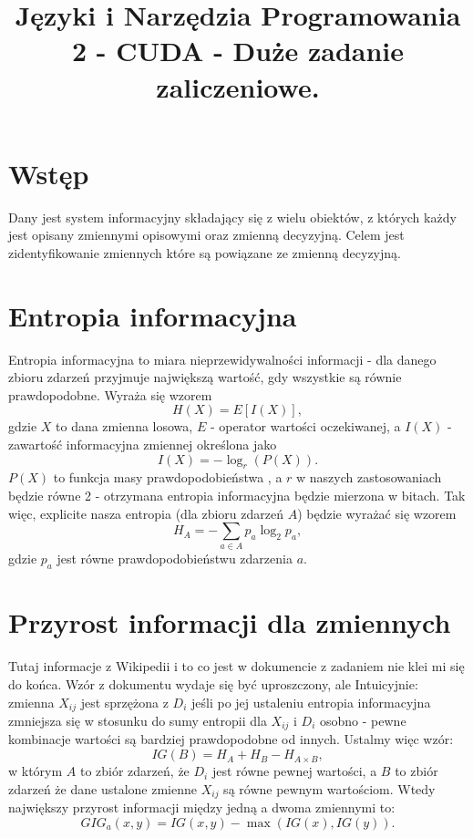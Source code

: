 \documentclass[a4paper]{article}
\title{Języki i Narzędzia Programowania 2 - CUDA - Duże zadanie zaliczeniowe.}
\begin{document}
    \maketitle
    \section{Wstęp}
    Dany jest system informacyjny składający się z wielu obiektów, z których każdy jest opisany zmiennymi opisowymi oraz zmienną decyzyjną. Celem jest zidentyfikowanie zmiennych które są powiązane ze zmienną decyzyjną.
    \section{Entropia informacyjna}
    Entropia informacyjna to miara nieprzewidywalności informacji - dla danego zbioru zdarzeń przyjmuje największą wartość, gdy wszystkie są równie prawdopodobne. Wyraża się wzorem
    \begin{equation} H(X) = E[I(X)], \end{equation}
gdzie $X$ to dana zmienna losowa, $E$ - operator wartości oczekiwanej, a $I(X)$ - zawartość informacyjna zmiennej określona jako
    \begin{equation} I(X) = -\log_r(P(X)). \end{equation}
$P(X)$ to funkcja masy prawdopodobieństwa , a $r$ w naszych zastosowaniach będzie równe 2 - otrzymana entropia informacyjna będzie mierzona w bitach. Tak więc, explicite nasza entropia (dla zbioru zdarzeń $A$) będzie wyrażać się wzorem
    \begin{equation} H_A = -\sum\limits_{a\in A} p_a \log_2 p_a, \end{equation}
gdzie $p_a$ jest równe prawdopodobieństwu zdarzenia $a$.
    \section{Przyrost informacji dla zmiennych}
    Tutaj informacje z Wikipedii i to co jest w dokumencie z zadaniem nie klei mi się do końca. Wzór z dokumentu wydaje się być uproszczony, ale 
    Intuicyjnie: zmienna $X_{ij}$ jest sprzężona z $D_i$ jeśli po jej ustaleniu entropia informacyjna zmniejsza się w stosunku do sumy entropii dla $X_{ij}$ i $D_i$ osobno - pewne kombinacje wartości są bardziej prawdopodobne od innych. Ustalmy więc wzór:
    \begin{equation} IG(B) = H_A +H_B - H_{A\times B}, \end{equation}
    w którym $A$ to zbiór zdarzeń, że $D_i$ jest równe pewnej wartości, a $B$ to zbiór zdarzeń że dane ustalone zmienne $X_{ij}$ są równe pewnym wartościom. Wtedy największy przyrost informacji między jedną a dwoma zmiennymi to:
    \begin{equation} GIG_{a}(x,y) = IG(x,y) - \max(IG(x), IG(y)). \end{equation}
\end{document}
